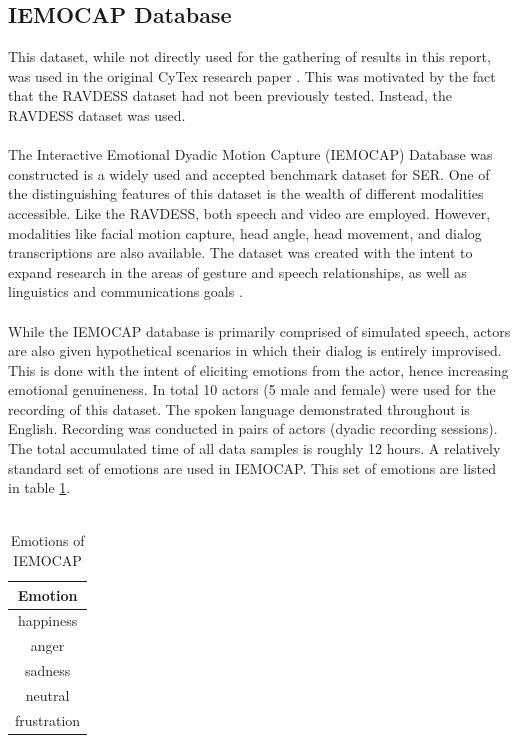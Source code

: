 \subsection{IEMOCAP Database}
This dataset, while not directly used for the gathering of results in this report, was used in the original CyTex research paper \cite{CyTexRef}. This was motivated by the fact that the RAVDESS dataset had not been previously tested. Instead, the RAVDESS dataset was used.\\ \\
The Interactive Emotional Dyadic Motion Capture (IEMOCAP) Database was constructed is a widely used and accepted benchmark dataset for SER. One of the distinguishing features of this dataset is the wealth of different modalities accessible. Like the RAVDESS, both speech and video are employed. However, modalities like facial motion capture, head angle, head movement, and dialog transcriptions are also available. The dataset was created with the intent to expand research in the areas of gesture and speech relationships, as well as linguistics and communications goals \cite{IEMOCAP_doc}.\\ \\
While the IEMOCAP database is primarily comprised of simulated speech, actors are also given hypothetical scenarios in which their dialog is entirely improvised. This is done with the intent of eliciting emotions from the actor, hence increasing emotional genuineness. In total 10 actors (5 male and female) were used for the recording of this dataset. The spoken language demonstrated throughout is English. Recording was conducted in pairs of actors (dyadic recording sessions). The total accumulated time of all data samples is roughly 12 hours. A relatively standard set of emotions are used in IEMOCAP. This set of emotions are listed in table \ref{iemocap_emo_table}.\\ \\
\begin{table}[]
    \centering
    \begin{tabular}{|c|}
    \hline
    Emotion \\ \hline \hline
    happiness \\ \hline
    anger \\ \hline
    sadness \\ \hline
    neutral \\ \hline
    frustration \\ \hline
    \end{tabular}
    \caption{Emotions of IEMOCAP}
    \label{iemocap_emo_table}
\end{table}
